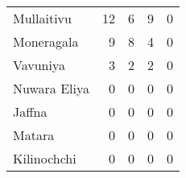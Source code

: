\begin{tabular}{lrrrr}
Mullaitivu   &             12 &              6 &              9 &              0 \\
Moneragala   &              9 &              8 &              4 &              0 \\
Vavuniya     &              3 &              2 &              2 &              0 \\
Nuwara Eliya &              0 &              0 &              0 &              0 \\
Jaffna       &              0 &              0 &              0 &              0 \\
Matara       &              0 &              0 &              0 &              0 \\
Kilinochchi  &              0 &              0 &              0 &              0 \\
\bottomrule
\end{tabular}
